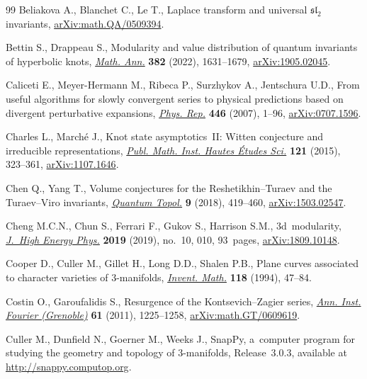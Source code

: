 \documentclass[pdftex]{sigma}
\numberwithin{equation}{section}
\begin{document}
\begin{thebibliography}{99}
Beliakova A., Blanchet C., Le T., Laplace transform and universal
  $\mathfrak{sl}_2$ invariants, \href{https://arxiv.org/abs/math.QA/0509394}{arXiv:math.QA/0509394}.

Bettin S., Drappeau S., Modularity and value distribution of quantum invariants
  of hyperbolic knots, \href{https://doi.org/10.1007/s00208-021-02288-2}{\textit{Math. Ann.}} \textbf{382} (2022), 1631--1679,
  \href{https://arxiv.org/abs/1905.02045}{arXiv:1905.02045}.

Caliceti E., Meyer-Hermann M., Ribeca P., Surzhykov A., Jentschura U.D., From
  useful algorithms for slowly convergent series to physical predictions based
  on divergent perturbative expansions, \href{https://doi.org/10.1016/j.physrep.2007.03.003}{\textit{Phys. Rep.}} \textbf{446}
  (2007), 1--96, \href{https://arxiv.org/abs/0707.1596}{arXiv:0707.1596}.

Charles L., March\'e J., Knot state asymptotics~{II}: {W}itten conjecture and
  irreducible representations, \href{https://doi.org/10.1007/s10240-015-0069-x}{\textit{Publ. Math. Inst. Hautes \'Etudes Sci.}}
  \textbf{121} (2015), 323--361, \href{https://arxiv.org/abs/1107.1646}{arXiv:1107.1646}.

Chen Q., Yang T., Volume conjectures for the {R}eshetikhin--{T}uraev and the
  {T}uraev--{V}iro invariants, \href{https://doi.org/10.4171/QT/111}{\textit{Quantum Topol.}} \textbf{9} (2018),
  419--460, \href{https://arxiv.org/abs/1503.02547}{arXiv:1503.02547}.

Cheng M.C.N., Chun S., Ferrari F., Gukov S., Harrison S.M., 3d~modularity,
  \href{https://doi.org/10.1007/jhep10(2019)010}{\textit{J.~High Energy Phys.}} \textbf{2019} (2019), no.~10, 010, 93~pages,
  \href{https://arxiv.org/abs/1809.10148}{arXiv:1809.10148}.

Cooper D., Culler M., Gillet H., Long D.D., Shalen P.B., Plane curves
  associated to character varieties of {$3$}-manifolds, \href{https://doi.org/10.1007/BF01231526}{\textit{Invent. Math.}}
  \textbf{118} (1994), 47--84.

Costin O., Garoufalidis S., Resurgence of the {K}ontsevich--{Z}agier series,
  \href{https://doi.org/10.5802/aif.2639}{\textit{Ann. Inst. Fourier (Grenoble)}} \textbf{61} (2011), 1225--1258,
  \href{https://arxiv.org/abs/math.GT/0609619}{arXiv:math.GT/0609619}.

Culler M., Dunfield N., Goerner M., Weeks J., Snap{P}y, a~computer program for
  studying the geometry and topology of $3$-manifolds, {R}elease~3.0.3,
  available at \url{http://snappy.computop.org}.


\end{thebibliography}
\end{document}
